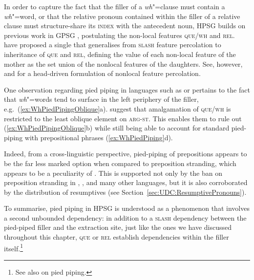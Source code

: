 \documentclass[output=paper
,notxmath 
 	        ,biblatex
                ,babelshorthands
                ,newtxmath
                ,draftmode
                ,colorlinks, citecolor=brown
]{langscibook}
\begin{document}
\noindent
In order to capture the fact that the filler of a \emph{wh}"=clause
must contain a \emph{wh}"=word, or that the relative pronoun contained
within the filler of a relative clause must structure-share its
\textsc{index} with the antecedent noun, HPSG builds on previous work
in GPSG \citep[Chapter~5.2]{Gazdar85}, postulating the non-local features
\textsc{que}/\textsc{wh} and \textsc{rel}. \citet[]{Pollard:Sag:94} have proposed
a single  that generalises from
\textsc{slash} feature percolation to inheritance of \textsc{que} and
\textsc{rel}, defining the value of each non-local feature of the
mother as the set union of the nonlocal features of the
daughters. See, however, \citet[Section~4.2]{Sag:97} and
\citet[Chapter~7]{Ginzburg:Sag:01} for a head-driven formulation of nonlocal feature percolation.

One observation regarding pied piping in languages such as  or
 pertains to the fact that \emph{wh}"=words tend to surface in
the left periphery of the filler, e.g.~(\ref{ex:WhPiedPipingOblique}a). \citet[194,~fn.~26]{Ginzburg:Sag:01} suggest that
amalgamation of \textsc{que/wh} is restricted to the least oblique
element on \textsc{arg-st}. This enables them to rule out
(\ref{ex:WhPiedPipingOblique}b) while still being able to account for
standard pied-piping with prepositional phrases
(\ref{ex:WhPiedPiping}d).

\begin{exe}
  \ex \label{ex:WhPiedPipingOblique}
  \begin{xlist}
  \end{xlist}
\end{exe}

\noindent
Indeed, from a cross-linguistic perspective, pied-piping of
prepositions appears to be the far less marked option when compared to
preposition stranding, which appears to be a peculiarity of
 \citep[cf.][]{Riemsdijk78a}. This is supported not only by the ban on preposition
stranding in , , and many other languages, but it is also
corroborated by the distribution of resumptives (see Section~\ref{sec:UDC:ResumptivePronouns}).

To summarise, pied piping in HPSG is understood as a phenomenon that
involves a second unbounded dependency: in addition to a
\textsc{slash} dependency between the pied-piped filler and the
extraction site, just like the ones we have discussed throughout this
chapter, \textsc{que} or \textsc{rel} establish dependencies within
the filler itself.\footnote{
See also  on pied
  piping.
}
\end{document}
